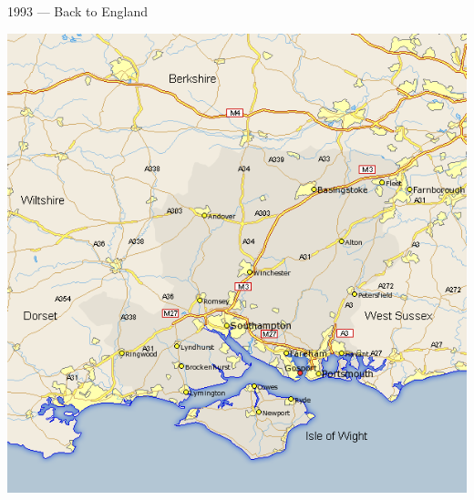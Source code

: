 \documentclass[t,xcolor={usenames,dvipsnames}]{beamer}
\begin{document}
\begin{frame}{1993 --- Back to England}
\begin{center}
\includegraphics[height=.8\textheight]{GosportMap}
\end{center}
\end{frame}
\end{document}

